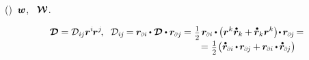 \vspace{-0.1em}\noindent
{}
()~${\bm{w}}$,
~${\vorticitytensor}$.


\nopagebreak\vspace{-0.4em}\begin{multline*}
\rateofdeformationtensor = \rateofdeformationcomponents{i\hspace{-0.1ex}j} \currentlocationvector^{i} \hspace{-0.2ex} \currentlocationvector^j
\hspace{-0.3ex} , \hspace{.6em}
\rateofdeformationcomponents{i\hspace{-0.1ex}j} \hspace{-0.2ex}
= \hspace{-0.1ex} \currentlocationvector_\differentialindex{i} \hspace{-0.1ex} \dotp \rateofdeformationtensor \dotp \currentlocationvector_\differentialindex{j} \hspace{-0.1ex}
= \hspace{.1ex} \smalldisplaystyleonehalf \hspace{.25ex} \currentlocationvector_\differentialindex{i} \hspace{-0.1ex} \dotp \hspace{-0.1ex} \bigl( \currentlocationvector^{k} \mathdotabove{\currentlocationvector}_{k} \hspace{-0.1ex} + \hspace{-0.1ex} \mathdotabove{\currentlocationvector}_k \currentlocationvector^{k} \bigr) \hspace{-0.4ex} \dotp \hspace{-0.15ex} \currentlocationvector_\differentialindex{\hspace{-0.1ex}j} \hspace{-0.2ex}
=
\\[-0.3em]
\shoveright{ \hfill \hspace{12em}
= \hspace{.1ex} \smalldisplaystyleonehalf \hspace{.1ex} \bigl( \mathdotabove{\currentlocationvector}_\differentialindex{i} \hspace{-0.1ex} \dotp \hspace{-0.15ex} \currentlocationvector_\differentialindex{\hspace{-0.1ex}j} \hspace{-0.1ex} + \hspace{-0.1ex} \currentlocationvector_\differentialindex{i} \hspace{-0.1ex} \dotp \hspace{-0.15ex} \mathdotabove{\currentlocationvector}_\differentialindex{\hspace{-0.1ex}j} \bigr) \hspace{-0.3ex}
}
\end{multline*}
